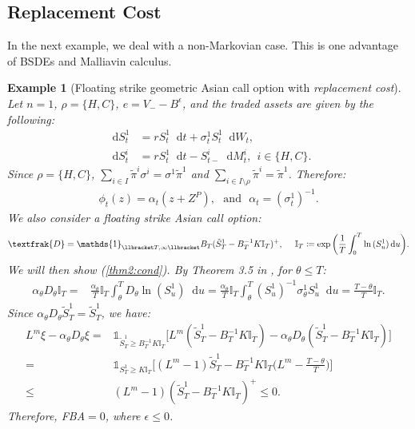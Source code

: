 \documentclass[a4paper, 11pt]{article}              %
\numberwithin{equation}{section}
\theoremstyle{plain}
\newcommand{\1}{\mathds{1}}
\newcommand{\frD}{\textfrak{D}}
\newcommand{\St}{\tilde{S}}
\newcommand{\pit}{\tilde{\pi}}
\newcommand{\dsI}{\mathbb{I}}
\theoremstyle{plain}
\theoremstyle{definition}
\newtheorem{example}[thm]{Example}
\theoremstyle{plain}
\newtheorem{example}{Example}
\newcommand*\df{\mathop{}\!\mathrm{d}}
\begin{document}
\subsection{Replacement Cost}
In the next example, we deal with a
non-Markovian case. This is one advantage of BSDEs and Malliavin calculus.
\begin{example}[Floating strike geometric Asian call option with
  \textit{replacement cost}]
Let $n=1$, $\rho = \{H, C\}$, $e = V_- - B^\epsilon$, and the traded assets are
given by the following:
\begin{align}
  \df S^1_t &= rS^1_t\df t + \sigma^1_tS^1_t\df W_t,\nonumber\\
  \df S^i_t &= rS^1_t\df t - S_{t-}^i\df M^i_t, ~~i \in \{H, C\}.\nonumber
\end{align}
Since $\rho = \{H, C\}$, $\sum_{i\in I}\pit^i\sigma^i =\sigma^1 \pit^1$ and
$\sum_{i\in I\setminus\rho}\pit^i = \pit^1$. Therefore:
\begin{align}
  \phi_t(z) = \alpha_t(z+Z^P), ~~~\text{and}~~~\alpha_t = (\sigma^1_t)^{-1}.
\end{align}
We also consider a floating strike Asian call option:
\begin{align}
  \frD = \1_{\llbracket T, \infty\llbracket}B_T(\St^1_T - B_T^{-1}K \dsI_T)^+,
  ~~~~\dsI_T \coloneqq \exp{\bigg(\frac{1}{T}\int_{0}^{T}\ln{(S^1_u)}\df u\bigg)}. 
  \nonumber 
\end{align}
We will then show (\ref{thm2:cond}). By
Theorem 3.5 in \cite{di2009malliavin}, for $\theta \leq T$:
\begin{align}
  \alpha_\theta D_\theta \dsI_T = &  \frac{\alpha_\theta}{T}\dsI_T\int_{\theta}^{T}D_\theta\ln{(S^1_u)}\df u
  =\frac{\alpha_\theta}{T}\dsI_T\int_{\theta}^{T}(S^1_u)^{-1}\sigma^1_\theta S^1_u\df u =\frac{T-\theta}{T}\dsI_T.\nonumber 
\end{align}
Since $  \alpha_\theta D_\theta\St^1_T = \St^1_T$, we have:
\begin{align}
 L^m\xi -\alpha_\theta D_\theta \xi =& \1_{\St^1_T \geq B_T^{-1}K \dsI_T}\big[L^m(\St^1_T - B_T^{-1}K
                    \dsI_T)-\alpha_\theta D_\theta(\St^1_T - B_T^{-1}K  \dsI_T)\big]\nonumber \\
  =&\1_{S^1_T \geq K \dsI_T}\Big[(L^m-1)\St^1_T - B^{-1}_TK
     \dsI_T\Big(L^m-\frac{T-\theta}{T}\Big)\Big]\nonumber \\
  \leq& (L^m-1)(\St^1_T- B^{-1}_TK \dsI_T)^+\leq0. \nonumber 
\end{align}
Therefore, FBA$=0$, where $\epsilon \leq0$. 
\end{example}
\end{document}
